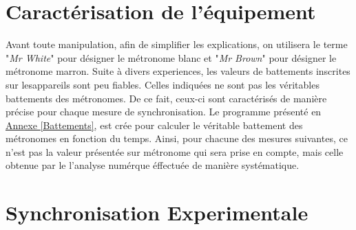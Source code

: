 \documentclass[a4paper,11pt]{report}
\begin{document}
\section{Caractérisation de l'équipement}
Avant toute manipulation, afin de simplifier les explications, on utilisera le terme "{\it Mr White}" pour désigner le métronome blanc et "{\it Mr Brown}" pour désigner le métronome marron. Suite à divers experiences, les valeurs de battements inscrites sur lesappareils sont peu fiables. Celles indiquées ne sont pas les véritables battements des métronomes. De ce fait, ceux-ci sont caractérisés de manière précise pour chaque mesure de synchronisation. Le programme présenté en \underline{Annexe \ref{Battements}}, est crée pour calculer le véritable battement des métronomes en fonction du temps. Ainsi, pour chacune des mesures suivantes, ce n'est pas la valeur présentée sur métronome qui sera prise en compte, mais celle obtenue par le l'analyse numérque éffectuée de manière systématique.

\section{Synchronisation Experimentale}
\end{document}
